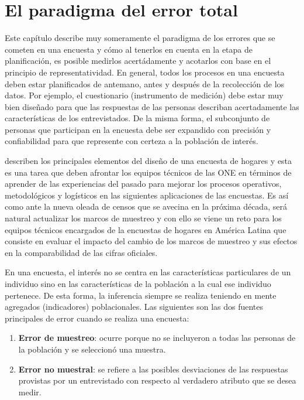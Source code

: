 \documentclass[
  12pt,
]{book}
\providecommand{\tightlist}{%
  \setlength{\itemsep}{0pt}\setlength{\parskip}{0pt}}
\begin{document}
\hypertarget{el-paradigma-del-error-total}{%
\chapter{El paradigma del error total}\label{el-paradigma-del-error-total}}

Este capítulo describe muy someramente el paradigma de los errores que se cometen en una encuesta y cómo al tenerlos en cuenta en la etapa de planificación, es posible medirlos acertádamente y acotarlos con base en el principio de representatividad. En general, todos los procesos en una encuesta deben estar planificados de antemano, antes y después de la recolección de los datos. Por ejemplo, el cuestionario (instrumento de medición) debe estar muy bien diseñado para que las respuestas de las personas describan acertadamente las características de los entrevistados. De la misma forma, el subconjunto de personas que participan en la encuesta debe ser expandido con precisión y confiabilidad para que represente con certeza a la población de interés.

\citet{Beland_Dale_Dufour_Hamel_2005} describen los principales elementos del diseño de una encuesta de hogares y esta es una tarea que deben afrontar los equipos técnicos de las ONE en términos de aprender de las experiencias del pasado para mejorar los procesos operativos, metodológicos y logísticos en las siguientes aplicaciones de las encuestas. Es así como ante la nueva oleada de censos que se avecina en la próxima década, será natural actualizar los marcos de muestreo y con ello se viene un reto para los equipos técnicos encargados de la encuestas de hogares en América Latina que consiste en evaluar el impacto del cambio de los marcos de muestreo y sus efectos en la comparabilidad de las cifras oficiales.

En una encuesta, el interés no se centra en las características particulares de un individuo sino en las características de la población a la cual ese individuo pertenece. De esta forma, la inferencia siempre se realiza teniendo en mente agregados (indicadores) poblacionales. Las siguientes son las dos fuentes principales de error cuando se realiza una encuesta:

\begin{enumerate}
\def\labelenumi{\arabic{enumi}.}
\tightlist
\item
  \textbf{Error de muestreo}: ocurre porque no se incluyeron a todas las personas de la población y se seleccionó una muestra.
\item
  \textbf{Error no muestral}: se refiere a las posibles desviaciones de las respuestas provistas por un entrevistado con respecto al verdadero atributo que se desea medir.
\end{enumerate}
\end{document}
